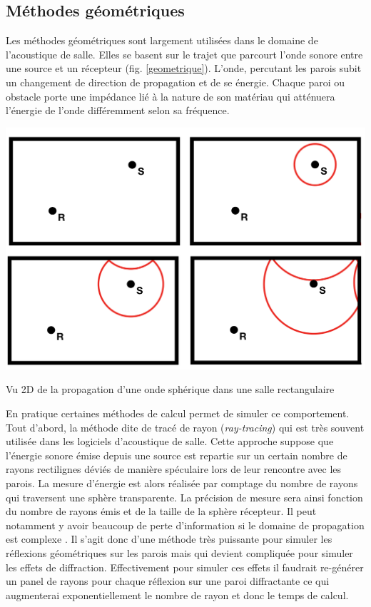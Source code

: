 	\subsection{Méthodes géométriques}
	
Les méthodes géométriques sont largement utilisées dans le domaine de l'acoustique de salle. Elles se basent sur le trajet que parcourt l'onde sonore entre une source et un récepteur (fig. \ref{geometrique}). L'onde, percutant les parois subit un changement de direction de propagation et de se énergie. Chaque paroi ou obstacle porte une impédance lié à la nature de son matériau qui atténuera l'énergie de l'onde différemment selon sa fréquence.

\begin{figureth}
	\includegraphics[width=0.8\linewidth]{images/geometrique}
	\caption{Vu 2D de la propagation d'une onde sphérique dans une salle rectangulaire}
	\label{geometrique}
\end{figureth}

En pratique certaines méthodes de calcul permet de simuler ce comportement. Tout d'abord, la méthode dite de tracé de rayon (\textit{ray-tracing}) \cite[p.449-468]{raytracing} qui est très souvent utilisée dans les logiciels d'acoustique de salle. Cette approche suppose que l’énergie sonore émise depuis une source est repartie sur un certain nombre de rayons rectilignes déviés de manière spéculaire lors de leur rencontre avec les parois. La mesure d'énergie est alors réalisée par comptage du nombre de rayons qui traversent une sphère transparente. La précision de mesure sera ainsi fonction du nombre de rayons émis et de la taille de la sphère récepteur. Il peut notamment y avoir beaucoup de perte d'information si le domaine de propagation est complexe \cite[p. 60]{picaut}. Il s'agit donc d'une méthode très puissante pour simuler les réflexions géométriques sur les parois mais qui devient compliquée pour simuler les effets de diffraction. Effectivement pour simuler ces effets il faudrait re-générer un panel de rayons pour chaque réflexion sur une paroi diffractante ce qui augmenterai exponentiellement le nombre de rayon et donc le temps de calcul. 

